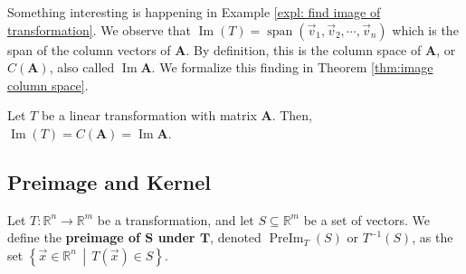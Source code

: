 \documentclass[]{book}
\DeclareMathOperator{\vecspan}{span}
\DeclareMathOperator{\image}{Im}
\DeclareMathOperator{\preimage}{PreIm}
\newcommand{\inv}[1]{\ensuremath{{#1}^{-1}}}
\newcommand{\vecn}[1]{\ensuremath{\vec{v}_{#1}}}
\newcommand{\suchthat}{\,\middle|\,}
\newcommand{\mat}[1]{\ensuremath{\mathbf{#1}}}
\newcommand{\R}{\ensuremath{\mathbb{R}}}
\begin{document}
Something interesting is happening in Example \ref{expl: find image of transformation}. We observe that $\image(T)=\vecspan(\vecn{1},\vecn{2},\cdots,\vecn{n})$ which is the span of the column vectors of $\mat{A}$. By definition, this is the column space of $\mat{A}$, or $C(\mat{A})$, also called $\image\mat{A}$. We formalize this finding in Theorem \ref{thm:image column space}.

\begin{theorem}
    \label{thm:image column space}
    Let $T$ be a linear transformation with matrix $\mat{A}$. Then, $\image(T)=C(\mat{A})=\image\mat{A}$.
\end{theorem}

\subsection{Preimage and Kernel}
\begin{definition}
    Let $T:\R^n \to \R^m$ be a transformation, and let $S \subseteq \R^m$ be a set of vectors. We define the \textbf{preimage of $\pmb{S}$ under $\pmb{T}$}, denoted $\preimage_{T}(S)$ or $\inv{T}(S)$, as the set $\left\{\vec{x} \in \R^n \suchthat T(\vec{x}) \in S\right\}$.
\end{definition}
\end{document}

